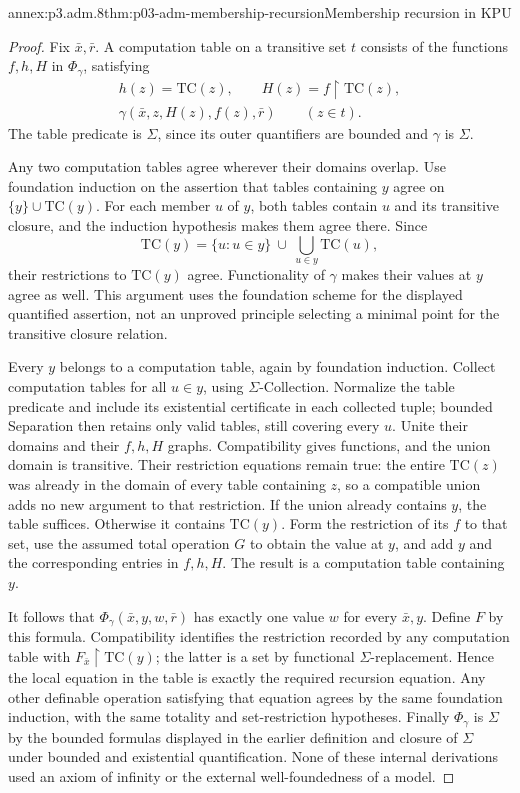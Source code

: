 \begin{annexitem}{annex:p3.adm.8}{thm:p03-adm-membership-recursion}{Membership recursion in KPU}
\begin{proof}
Fix \(\bar x,\bar r\). A computation table on a transitive set \(t\)
consists of the functions \(f,h,H\) in \(\Phi_\gamma\), satisfying
\[
 \begin{gathered}
 h(z)=\mathrm{TC}(z),\qquad H(z)=f\restriction\mathrm{TC}(z),\\
 \gamma(\bar x,z,H(z),f(z),\bar r)\qquad(z\in t).
 \end{gathered}
\]
The table predicate is \(\Sigma\), since its outer quantifiers are
bounded and \(\gamma\) is \(\Sigma\).

Any two computation tables agree wherever their domains overlap.
Use foundation induction on the assertion that tables containing \(y\)
agree on \(\{y\}\cup\mathrm{TC}(y)\). For each member \(u\) of \(y\),
both tables contain \(u\) and its transitive closure, and the induction
hypothesis makes them agree there. Since
\[
 \mathrm{TC}(y)=
 \{u:u\in y\}\ \cup\ \bigcup_{u\in y}\mathrm{TC}(u),
\]
their restrictions to \(\mathrm{TC}(y)\) agree. Functionality of
\(\gamma\) makes their values at \(y\) agree as well. This argument
uses the foundation scheme for the displayed quantified assertion, not
an unproved principle selecting a minimal point for the transitive
closure relation.

Every \(y\) belongs to a computation table, again by foundation
induction. Collect computation tables for all \(u\in y\), using
\(\Sigma\)-Collection. Normalize the table predicate and include its
existential certificate in each collected tuple; bounded Separation
then retains only valid tables, still covering every \(u\). Unite their
domains and their \(f,h,H\) graphs. Compatibility gives functions, and
the union domain is transitive. Their restriction equations remain true:
the entire \(\mathrm{TC}(z)\) was already in the domain of every table
containing \(z\), so a compatible union adds no new argument to that
restriction. If the union already contains \(y\), the table suffices.
Otherwise it contains \(\mathrm{TC}(y)\). Form the restriction of its
\(f\) to that set, use the assumed total operation \(G\) to obtain the
value at \(y\), and add \(y\) and the corresponding entries in
\(f,h,H\). The result is a computation table containing \(y\).

It follows that \(\Phi_\gamma(\bar x,y,w,\bar r)\) has exactly one
value \(w\) for every \(\bar x,y\). Define \(F\) by this formula.
Compatibility identifies the restriction recorded by any computation
table with \(F_{\bar x}\restriction\mathrm{TC}(y)\); the latter is a set
by functional \(\Sigma\)-replacement. Hence the local equation in the
table is exactly the required recursion equation. Any other definable
operation satisfying that equation agrees by the same foundation
induction, with the same totality and set-restriction hypotheses.
Finally \(\Phi_\gamma\) is \(\Sigma\) by the bounded formulas displayed
in the earlier definition and closure of \(\Sigma\) under bounded and
existential quantification. None of these internal derivations used an
axiom of infinity or the external well-foundedness of a model.
\end{proof}
\end{annexitem}

